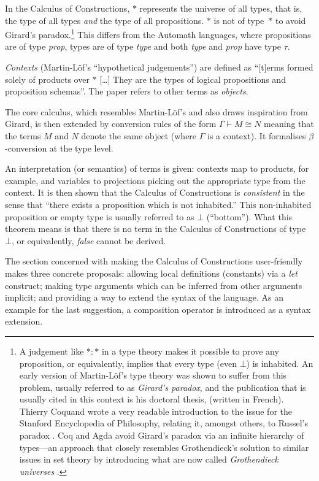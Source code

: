\documentclass[12pt,toc=bibliography,numbers=noendperiod,
               footnotes=multiple,twoside]{scrartcl}
\begin{document}
In the Calculus of Constructions, \(*\) represents the universe of all types, that is, the type of all types \emph{and} the type of all propositions. \(*\) is not of type~\(*\) to avoid Girard's paradox.\footnote{A judgement like \(* : *\) in a type theory makes it possible to prove any proposition, or equivalently, implies that every type (even \(\bot\)) is inhabited. An early version of Martin-Löf's type theory was shown to suffer from this problem, usually referred to as \emph{Girard's paradox}, and the publication that is usually cited in this context is his doctoral thesis, \textcite{girard_interpretation_1972} (written in French). Thierry Coquand wrote a very readable introduction to the issue for the Stanford Encyclopedia of Philosophy, relating it, amongst others, to Russel's paradox \autocite{coquand_type_2014}. Coq and Agda avoid Girard's paradox via an infinite hierarchy of types---an approach that closely resembles Grothendieck's solution to similar issues in set theory by introducing what are now called \emph{Grothendieck universes} \autocite{artin_orie_1972}.} This differs from the Automath languages, where propositions are of type \textit{prop}, types are of type \textit{type} and both \textit{type} and \textit{prop} have type \(\tau\).

\emph{Contexts} (Martin-Löf's \enquote{hypothetical judgements}) are defined as \enquote{[t]erms formed solely of products over \(*\) [\dots] They are the types of logical propositions and proposition schemas}. The paper refers to other terms as \emph{objects}.

The core calculus, which resembles Martin-Löf's and also draws inspiration from Girard, is then extended by conversion rules of the form \(\Gamma \vdash M \cong N\) meaning that the terms \(M\) and \(N\) denote the same object (where \(\Gamma\) is a context). It formalises \(\beta\)-conversion at the type level.

An interpretation (or semantics) of terms is given: contexts map to products, for example, and variables to projections picking out the appropriate type from the context. It is then shown that the Calculus of Constructions is \emph{consistent} in the sense that \enquote{there exists a proposition which is not inhabited.} This non-inhabited proposition or empty type is usually referred to as \(\bot\) (\enquote{bottom}). What this theorem means is that there is no term in the Calculus of Constructions of type \(\bot\), or equivalently, \emph{false} cannot be derived.

The section concerned with making the Calculus of Constructions user-friendly makes three concrete proposals: allowing local definitions (constants) via a \textit{let} construct; making type arguments which can be inferred from other arguments implicit; and providing a way to extend the syntax of the language. As an example for the last suggestion, a composition operator is introduced as a syntax extension.
\end{document}
